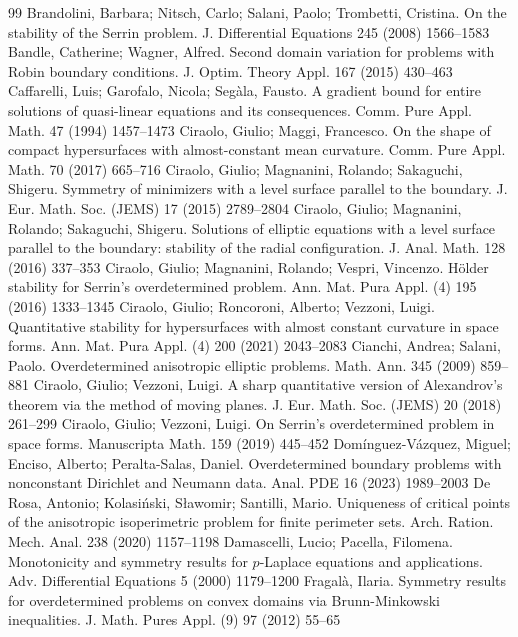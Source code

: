 \documentclass[10pt,a4paper]{amsart}
\numberwithin{equation}{section}
\begin{document}
\begin{thebibliography}{99}
 Brandolini, Barbara; Nitsch, Carlo; Salani, Paolo; Trombetti, Cristina. On the stability of the {S}errin problem. J. Differential Equations 245 (2008) 1566--1583
 Bandle, Catherine; Wagner, Alfred. Second domain variation for problems with {R}obin boundary conditions. J. Optim. Theory Appl. 167 (2015) 430--463
 Caffarelli, Luis; Garofalo, Nicola; Seg\`ala, Fausto. A gradient bound for entire solutions of quasi-linear equations and its consequences. Comm. Pure Appl. Math. 47 (1994) 1457--1473
 Ciraolo, Giulio; Maggi, Francesco. On the shape of compact hypersurfaces with almost-constant mean curvature. Comm. Pure Appl. Math. 70 (2017) 665--716
 Ciraolo, Giulio; Magnanini, Rolando; Sakaguchi, Shigeru. Symmetry of minimizers with a level surface parallel to the boundary. J. Eur. Math. Soc. (JEMS) 17 (2015) 2789--2804
 Ciraolo, Giulio; Magnanini, Rolando; Sakaguchi, Shigeru. Solutions of elliptic equations with a level surface parallel to the boundary: stability of the radial configuration. J. Anal. Math. 128 (2016) 337--353
 Ciraolo, Giulio; Magnanini, Rolando; Vespri, Vincenzo. H\"older stability for {S}errin's overdetermined problem. Ann. Mat. Pura Appl. (4) 195 (2016) 1333--1345
 Ciraolo, Giulio; Roncoroni, Alberto; Vezzoni, Luigi. Quantitative stability for hypersurfaces with almost constant curvature in space forms. Ann. Mat. Pura Appl. (4) 200 (2021) 2043--2083
 Cianchi, Andrea; Salani, Paolo. Overdetermined anisotropic elliptic problems. Math. Ann. 345 (2009) 859--881
 Ciraolo, Giulio; Vezzoni, Luigi. A sharp quantitative version of {A}lexandrov's theorem via the method of moving planes. J. Eur. Math. Soc. (JEMS) 20 (2018) 261--299
 Ciraolo, Giulio; Vezzoni, Luigi. On {S}errin's overdetermined problem in space forms. Manuscripta Math. 159 (2019) 445--452
 Dom\'inguez-V\'azquez, Miguel; Enciso, Alberto; Peralta-Salas, Daniel. Overdetermined boundary problems with nonconstant {D}irichlet and {N}eumann data. Anal. PDE 16 (2023) 1989--2003
 De Rosa, Antonio; Kolasi\'nski, S\l awomir; Santilli, Mario. Uniqueness of critical points of the anisotropic isoperimetric problem for finite perimeter sets. Arch. Ration. Mech. Anal. 238 (2020) 1157--1198
 Damascelli, Lucio; Pacella, Filomena. Monotonicity and symmetry results for {$p$}-{L}aplace equations and applications. Adv. Differential Equations 5 (2000) 1179--1200
 Fragal\`a, Ilaria. Symmetry results for overdetermined problems on convex domains via {B}runn-{M}inkowski inequalities. J. Math. Pures Appl. (9) 97 (2012) 55--65

\end{thebibliography}
\end{document}
